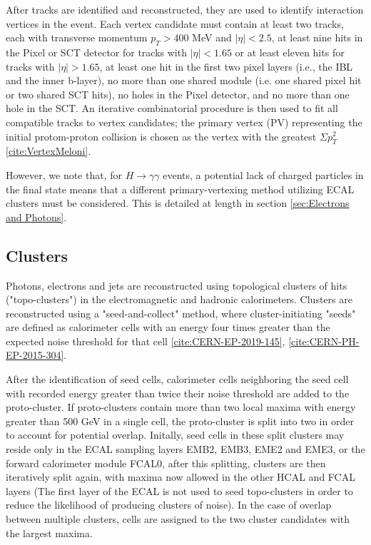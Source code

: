 After tracks are identified and reconstructed, they are used to identify interaction vertices in the event. Each vertex candidate must contain at least two tracks, each with transverse momentum $p_{T} > 400$ MeV and $|\eta|<2.5$, at least nine hits in the Pixel or SCT detector for tracks with $|\eta|<1.65$ or at least eleven hits for tracks with $|\eta|>1.65$, at least one hit in the first two pixel layers (i.e., the IBL and the inner b-layer), no more than one shared module (i.e. one shared pixel hit or two shared SCT hits), no holes in the Pixel detector, and no more than one hole in the SCT. An iterative combinatorial procedure is then used to fit all compatible tracks to vertex candidates; the primary vertex (PV) representing the initial protom-proton collision is chosen as the vertex with the greatest $\Sigma p_{T}^{2}$ \ref{cite:VertexMeloni}.

However, we note that, for $H \rightarrow \gamma \gamma$ events, a potential lack of charged particles in the final state means that a different primary-vertexing method utilizing ECAL clusters must be considered. This is detailed at length in section \ref{sec:Electrons and Photons}.


\subsection{Clusters} \label{sec:Clusters} 

Photons, electrons and jets are reconstructed using topological clusters of hits ("topo-clusters") in the electromagnetic and hadronic calorimeters. Clusters are reconstructed using a "seed-and-collect" method, where cluster-initiating "seeds" are defined as calorimeter cells with an energy four times greater than the expected noise threshold for that cell  \ref{cite:CERN-EP-2019-145}, \ref{cite:CERN-PH-EP-2015-304}.

After the identification of seed cells, calorimeter cells neighboring the seed cell with recorded energy greater than twice their noise threshold are added to the proto-cluster. If proto-clusters contain more than two local maxima with energy greater than 500 GeV in a single cell, the proto-cluster is split into two in order to account for potential overlap. Initally, seed cells in these split clusters may reside only in the ECAL sampling layers EMB2, EMB3, EME2 and EME3, or the forward calorimeter module FCAL0, after this splitting, clusters are then iteratively split again, with maxima now allowed in the other HCAL and FCAL layers (The first layer of the ECAL is not used to seed topo-clusters in order to reduce the likelihood of producing clusters of noise). In the case of overlap between multiple clusters, cells are assigned to the two cluster candidates with the largest maxima.

